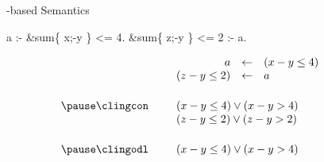 \begin{frame}[fragile]{\HTC-based Semantics}
  \smallskip
  \begin{semiverbatim}
                            a :- &sum\{ x;-y \} <= 4.
            &sum\{ z;-y \} <= 2 :- a.
  \end{semiverbatim}
  \bigskip\pause
  \[
    \begin{array}{rp{5pt}rclp{20pt}}
                     && a            &\leftarrow&  (x-y\leq 4)         &\\
                     && (z-y\leq 2)  &\leftarrow&  a                   &\\[15pt]\pause
    \text{\clingcon} && \multicolumn{3}{l}{(x-y\leq 4) \vee (x-y > 4)} &\\
                     && \multicolumn{3}{l}{(z-y\leq 2) \vee (z-y>2)}   &\\[15pt]\pause
    \text{\clingodl} && \multicolumn{3}{l}{(x-y\leq 4) \vee (x-y > 4)} &
    \end{array}
  \]
\end{frame}
%
